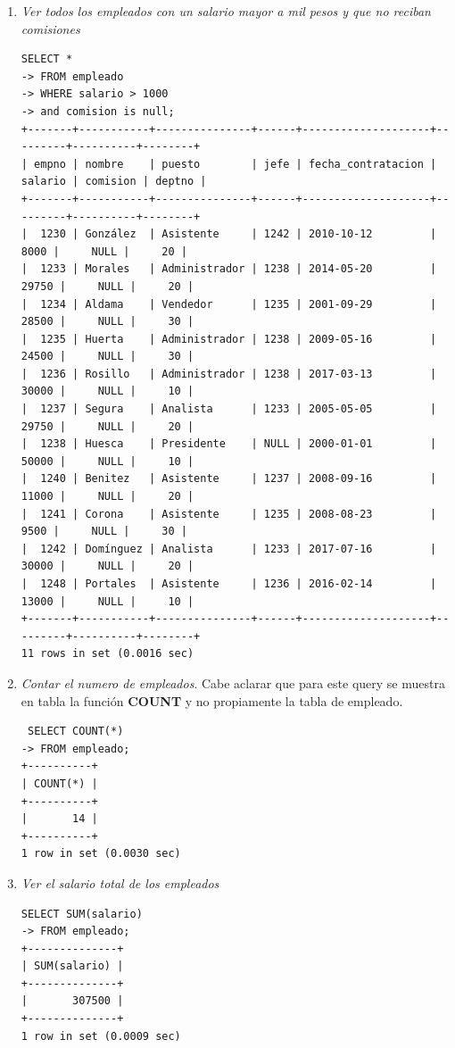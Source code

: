 \documentclass[titlepage,a4paper]{article}
\theoremstyle{definition}
\theoremstyle{remark}
\begin{document}
\begin{enumerate}
    \item \textit{Ver todos los empleados con un salario mayor a mil pesos y que no reciban comisiones}
    \begin{lstlisting}
SELECT *
-> FROM empleado
-> WHERE salario > 1000
-> and comision is null;
+-------+-----------+---------------+------+--------------------+---------+----------+--------+
| empno | nombre    | puesto        | jefe | fecha_contratacion | salario | comision | deptno |
+-------+-----------+---------------+------+--------------------+---------+----------+--------+
|  1230 | González  | Asistente     | 1242 | 2010-10-12         |    8000 |     NULL |     20 |
|  1233 | Morales   | Administrador | 1238 | 2014-05-20         |   29750 |     NULL |     20 |
|  1234 | Aldama    | Vendedor      | 1235 | 2001-09-29         |   28500 |     NULL |     30 |
|  1235 | Huerta    | Administrador | 1238 | 2009-05-16         |   24500 |     NULL |     30 |
|  1236 | Rosillo   | Administrador | 1238 | 2017-03-13         |   30000 |     NULL |     10 |
|  1237 | Segura    | Analista      | 1233 | 2005-05-05         |   29750 |     NULL |     20 |
|  1238 | Huesca    | Presidente    | NULL | 2000-01-01         |   50000 |     NULL |     10 |
|  1240 | Benitez   | Asistente     | 1237 | 2008-09-16         |   11000 |     NULL |     20 |
|  1241 | Corona    | Asistente     | 1235 | 2008-08-23         |    9500 |     NULL |     30 |
|  1242 | Domínguez | Analista      | 1233 | 2017-07-16         |   30000 |     NULL |     20 |
|  1248 | Portales  | Asistente     | 1236 | 2016-02-14         |   13000 |     NULL |     10 |
+-------+-----------+---------------+------+--------------------+---------+----------+--------+
11 rows in set (0.0016 sec)
    \end{lstlisting}

    
    \item \textit{Contar el numero de empleados}. Cabe aclarar que para este query se muestra en tabla la función \textbf{COUNT} y no propiamente la tabla de empleado.
    \begin{lstlisting}
 SELECT COUNT(*)
-> FROM empleado;
+----------+
| COUNT(*) |
+----------+
|       14 |
+----------+
1 row in set (0.0030 sec)
    \end{lstlisting}


    \item \textit{Ver el salario total de los empleados}
    \begin{lstlisting}
SELECT SUM(salario)
-> FROM empleado;
+--------------+
| SUM(salario) |
+--------------+
|       307500 |
+--------------+
1 row in set (0.0009 sec)
    \end{lstlisting}



\end{enumerate}
\end{document}
